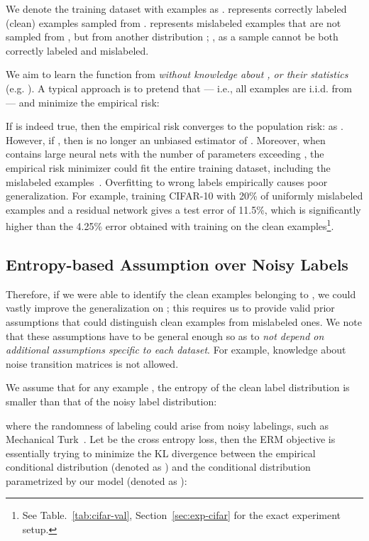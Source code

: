 \documentclass[a4paper,11pt]{article}
\begin{document}
We denote the training dataset with  examples as .  represents correctly labeled (clean) examples sampled from .  represents mislabeled examples that are not sampled from , but from another distribution ; , as a sample cannot be both correctly labeled and mislabeled. 


We aim to learn the function  from  \emph{without knowledge about ,  or their statistics} (e.g. ). 
A typical approach is to pretend that  --- i.e., all examples are i.i.d. from  --- and minimize the empirical risk:

If  is indeed true, then the empirical risk converges to the population risk:  as . However, if , then  is no longer an unbiased estimator of . 
Moreover, when  contains large neural nets with the number of parameters exceeding , the empirical risk minimizer could fit the entire training dataset, including the mislabeled examples~\cite{zhang2016understanding}. Overfitting to wrong labels empirically causes poor generalization.  For example, training CIFAR-10 with 20\% of uniformly mislabeled examples and a residual network gives a test error of 11.5\%, which is significantly higher than the 4.25\% error obtained with training on the clean examples\footnote{See Table.~\ref{tab:cifar-val}, Section~\ref{sec:exp-cifar} for the exact experiment setup.}.



\subsection{Entropy-based Assumption over Noisy Labels}
Therefore, if we were able to identify the clean examples belonging to , we could vastly improve the generalization on ; this requires us to provide valid prior assumptions that could distinguish clean examples from mislabeled ones. We note that these assumptions have to be general enough so as to \textit{not depend on additional assumptions specific to each dataset}. For example, knowledge about noise transition matrices is not allowed.

We assume that for any example , the entropy of the clean label distribution is smaller than that of the noisy label distribution:

where the randomness of labeling  could arise from noisy labelings, such as Mechanical Turk~\cite{krishna2016embracing}.
Let  be the cross entropy loss, then the ERM objective is essentially trying to minimize the KL divergence between the empirical conditional distribution (denoted as ) and the conditional distribution parametrized by our model (denoted as ):
\end{document}
